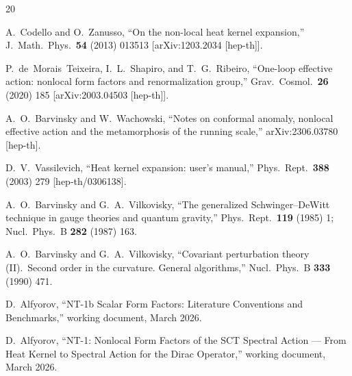 \documentclass[11pt,a4paper]{article}
\theoremstyle{definition}
\theoremstyle{remark}
\begin{document}
\begin{thebibliography}{20}

A.~Codello and O.~Zanusso,
``On the non-local heat kernel expansion,''
J.\ Math.\ Phys.\ \textbf{54} (2013) 013513
[arXiv:1203.2034 [hep-th]].

P.~de~Morais~Teixeira, I.~L.~Shapiro, and T.~G.~Ribeiro,
``One-loop effective action: nonlocal form factors and
renormalization group,''
Grav.\ Cosmol.\ \textbf{26} (2020) 185
[arXiv:2003.04503 [hep-th]].

A.~O.~Barvinsky and W.~Wachowski,
``Notes on conformal anomaly, nonlocal effective action and the
metamorphosis of the running scale,''
arXiv:2306.03780 [hep-th].

D.~V.~Vassilevich,
``Heat kernel expansion: user's manual,''
Phys.\ Rept.\ \textbf{388} (2003) 279
[hep-th/0306138].

A.~O.~Barvinsky and G.~A.~Vilkovisky,
``The generalized Schwinger--DeWitt technique in gauge theories
and quantum gravity,''
Phys.\ Rept.\ \textbf{119} (1985) 1;
Nucl.\ Phys.\ B \textbf{282} (1987) 163.

A.~O.~Barvinsky and G.~A.~Vilkovisky,
``Covariant perturbation theory (II).\ Second order in the curvature.
General algorithms,''
Nucl.\ Phys.\ B \textbf{333} (1990) 471.

D.~Alfyorov,
``NT-1b Scalar Form Factors: Literature Conventions and Benchmarks,''
working document, March 2026.

D.~Alfyorov,
``NT-1: Nonlocal Form Factors of the SCT Spectral Action ---
From Heat Kernel to Spectral Action for the Dirac Operator,''
working document, March 2026.

\end{thebibliography}
\end{document}
